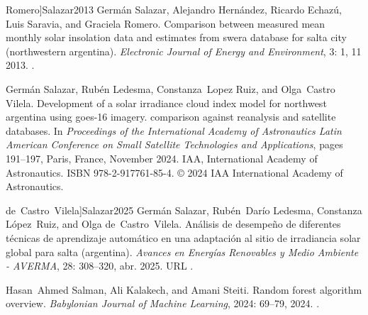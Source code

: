 \documentclass[letterpaper,12pt, twoside]{report}
\providecommand{\DIFdeltex}[1]{{\protect\color{red} \scriptsize #1}} %
\providecommand{\DIFdel}[1]{\texorpdfstring{\DIFdeltex{#1}}{}} %
\begin{document}
  Romero]{Salazar2013}
\DIFdel{Germán Salazar, Alejandro Hernández, Ricardo Echazú, Luis Saravia, and
  Graciela Romero.
}%
\DIFdel{Comparison between measured mean monthly solar insolation data and
  estimates from swera database for salta city (northwestern argentina).
}%
\DIFdel{\emph{Electronic Journal of Energy and Environment}, 3:}%
\DIFdel{1,
  11 2013.
}%
\DIFdel{.
}%

\DIFdel{Germán Salazar, Rubén Ledesma, Constanza~Lopez Ruiz, and Olga~Castro Vilela.
}%
\DIFdel{Development of a solar irradiance cloud index model for northwest
  argentina using goes-16 imagery. comparison against reanalysis and satellite
  databases.
}%
\DIFdel{In \emph{Proceedings of the International Academy of Astronautics
  Latin American Conference on Small Satellite Technologies and Applications},
  pages 191--197, Paris, France, November 2024. IAA, International Academy of
  Astronautics.
}%
\DIFdel{ISBN 978-2-917761-85-4.
}%
\DIFdel{© 2024 IAA International Academy of Astronautics.
}%

  de~Castro~Vilela]{Salazar2025}
\DIFdel{Germán Salazar, Rubén~Darío Ledesma, Constanza López~Ruiz, and Olga
  de~Castro~Vilela.
}%
\DIFdel{Análisis de desempeño de diferentes técnicas de aprendizaje
  automático en una adaptación al sitio de irradiancia solar global para
  salta (argentina).
}%
\DIFdel{\emph{Avances en Energías Renovables y Medio Ambiente - AVERMA},
  28:}%
\DIFdel{308–320, abr. 2025.
}%
\DIFdel{URL
  }%
\DIFdel{.
}%

\DIFdel{Hasan~Ahmed Salman, Ali Kalakech, and Amani Steiti.
}%
\DIFdel{Random forest algorithm overview.
}%
\DIFdel{\emph{Babylonian Journal of Machine Learning}, 2024:}%
\DIFdel{69--79,
  2024.
}%
\DIFdel{.
}%
\end{document}

